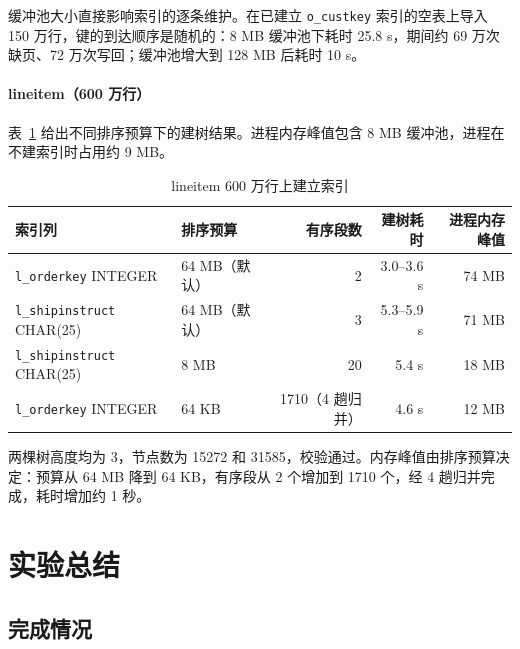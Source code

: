 \documentclass[11pt,a4paper]{ctexart}
\newcommand{\code}[1]{\texttt{#1}}
\begin{document}
缓冲池大小直接影响索引的逐条维护。在已建立 \code{o\_custkey} 索引的空表上导入 150 万行，键的到达顺序是随机的：8 MB 缓冲池下耗时 25.8 s，期间约 69 万次缺页、72 万次写回；缓冲池增大到 128 MB 后耗时 10 s。

\paragraph{lineitem（600 万行）}表~\ref{tab:lineitem} 给出不同排序预算下的建树结果。进程内存峰值包含 8 MB 缓冲池，进程在不建索引时占用约 9 MB。

\begin{table}[H]
  \centering
  \caption{lineitem 600 万行上建立索引}
  \label{tab:lineitem}
  \begin{tabular}{llrrr}
    \toprule
    索引列 & 排序预算 & 有序段数 & 建树耗时 & 进程内存峰值 \\
    \midrule
    \code{l\_orderkey} INTEGER & 64 MB（默认） & 2 & 3.0--3.6 s & 74 MB \\
    \code{l\_shipinstruct} CHAR(25) & 64 MB（默认） & 3 & 5.3--5.9 s & 71 MB \\
    \code{l\_shipinstruct} CHAR(25) & 8 MB & 20 & 5.4 s & 18 MB \\
    \code{l\_orderkey} INTEGER & 64 KB & 1710（4 趟归并） & 4.6 s & 12 MB \\
    \bottomrule
  \end{tabular}
\end{table}

两棵树高度均为 3，节点数为 15272 和 31585，校验通过。内存峰值由排序预算决定：预算从 64 MB 降到 64 KB，有序段从 2 个增加到 1710 个，经 4 趟归并完成，耗时增加约 1 秒。

\section{实验总结}

\subsection{完成情况}
\end{document}
